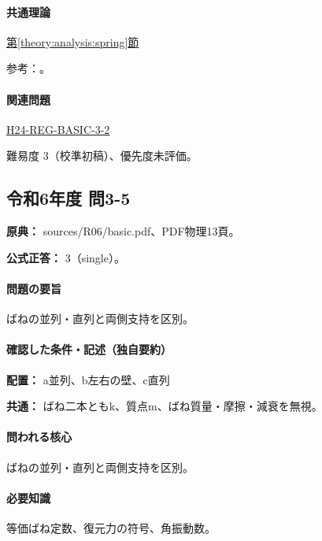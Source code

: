 \paragraph{共通理論} \hyperref[theory:analysis:spring]{第\ref*{theory:analysis:spring}節}

\par 参考：\cite{analysis57_shm}。

\paragraph{関連問題} \hyperref[q:h24-reg-basic-3-2]{H24-REG-BASIC-3-2}

\par 難易度 3（校準初稿）、優先度未評価。

\subsection{令和6年度 問3-5}
\label{q:r06-reg-basic-3-5}

\noindent\textbf{原典：} sources/R06/basic.pdf、PDF物理13頁。

\textbf{公式正答：} 3（single）。

\paragraph{問題の要旨} ばねの並列・直列と両側支持を区別。

\paragraph{確認した条件・記述（独自要約）}\mbox{}\par

\noindent\textbf{配置：} a並列、b左右の壁、c直列\par

\noindent\textbf{共通：} ばね二本ともk、質点m、ばね質量・摩擦・減衰を無視。\par

\paragraph{問われる核心} ばねの並列・直列と両側支持を区別。

\paragraph{必要知識} 等価ばね定数、復元力の符号、角振動数。

